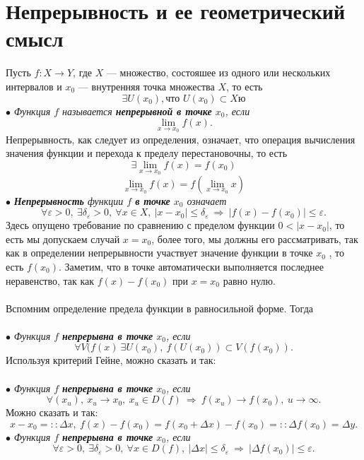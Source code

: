 \section{Непрерывность и ее геометрический смысл}
Пусть $f: X \rightarrow Y$, где $X$ --- множество, состояшее из одного или нескольких интервалов и $x_0$ --- внутренняя точка множества $X$, то есть
$$\exists U(x_0), \text{что } U(x_0) \subset Xю$$
$\bullet$ \textit{Функция $f$ называется \textbf{непрерывной в точке} $x_0$, если}
$$\lim\limits_{x \rightarrow x_0} f(x).$$
Непрерывность, как следует из определения, означает, что операция вычисления значения функции и перехода к пределу перестановочны, то есть
$$\exists \lim\limits_{x \rightarrow x_0} f(x) = f(x_0)$$
$$\lim\limits_{x \rightarrow x_0} f(x) = f(\lim\limits_{x \rightarrow x_0} x)$$
$\bullet$ \textit{\textbf{Непрерывность} функции $f$ \textbf{в точке} $x_0$ означает }
$$\forall \varepsilon > 0,\ \exists \delta_\varepsilon > 0,\ \forall x \in X,\ \vert x - x_0 \vert \leqslant \delta_\varepsilon\ \Rightarrow\ \vert f(x) - f(x_0) \vert \leqslant \varepsilon.$$
Здесь опущено требование по сравнению с пределом функции $0 < \vert x - x_0 \vert$, то есть мы допускаем случай $x = x_0$, более того, мы должны его рассматривать, так как в определении непрерывности участвует значение функции в точке $x_0$ , то есть $f(x_0)$. Заметим, что в точке  автоматически выполняется последнее неравенство, так как $f(x) - f(x_0)$ при $x = x_0$ равно нулю.\\\\
Вспомним определение предела функции в равносильной форме. Тогда\\\\
$\bullet$ \textit{Функция $f$ \textbf{непрерывна в точке} $x_0$, если}
$$\forall V(f(x)\ \exists U(x_0),\ f(U(x_0)) \subset V(f(x_0)).$$
Используя критерий Гейне, можно сказать и так:\\\\
$\bullet$\textit{ Функция $f$ \textbf{непрерывна в точке} $x_0$, если}
$$\forall (x_u),\ x_u \rightarrow x_0,\ x_u \in D(f)\ \Rightarrow \ f(x_u) \rightarrow f(x_0),\ u \rightarrow \infty.$$
Можно сказать и так:
$$x - x_0 =:: \Delta x,\ f(x) - f(x_0) = f(x_0 + \Delta x) - f(x_0) =:: \Delta f(x_0) = \Delta y.$$
$\bullet$ \textit{Функция $f$ \textbf{непрерывна в точке} $x_0$, если}
$$\forall \varepsilon > 0,\ \exists \delta_\varepsilon > 0,\ \forall x \in D(f), \ \vert \Delta x \vert \leqslant \delta _\varepsilon \ \Rightarrow \ \vert \Delta f(x_0) \vert \leqslant \varepsilon.$$
